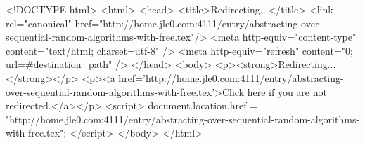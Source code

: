 <!DOCTYPE html>
<html>
<head>
<title>Redirecting...</title>
<link rel="canonical" href="http://home.jle0.com:4111/entry/abstracting-over-sequential-random-algorithms-with-free.tex"/>
<meta http-equiv="content-type" content="text/html; charset=utf-8" />
<meta http-equiv="refresh" content="0; url=#{destination_path}" />
</head>
<body>
  <p><strong>Redirecting...</strong></p>
  <p><a href='http://home.jle0.com:4111/entry/abstracting-over-sequential-random-algorithms-with-free.tex'>Click here if you are not redirected.</a></p>
  <script>
    document.location.href = "http://home.jle0.com:4111/entry/abstracting-over-sequential-random-algorithms-with-free.tex";
  </script>
</body>
</html>
